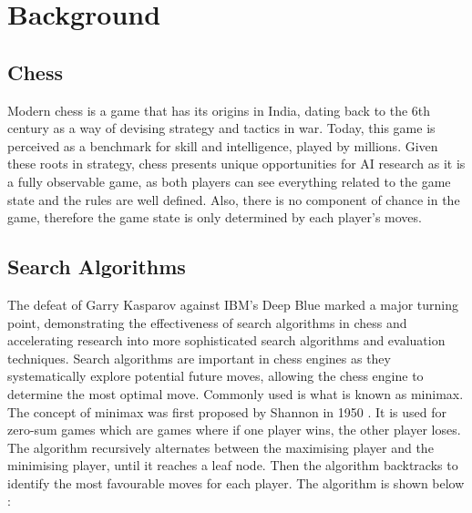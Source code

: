 \chapter{Background}
\section{Chess}
Modern chess is a game that has its origins in India, dating back to the 6th century \cite{averbakhHistoryChessChaturanga2012} as a way of devising strategy and tactics in war. Today, this game is perceived as a benchmark for skill and intelligence, played by millions. Given these roots in strategy, chess presents unique opportunities for AI research as it is a fully observable game, as both players can see everything related to the game state and the rules are well defined. Also, there is no component of chance in the game, therefore the game state is only determined by each player's moves.


\section{Search Algorithms}

The defeat of Garry Kasparov against IBM's Deep Blue marked a major turning point, demonstrating the effectiveness of search algorithms in chess and accelerating research into more sophisticated search algorithms and evaluation techniques. Search algorithms are important in chess engines as they systematically explore potential future moves, allowing the chess engine to determine the most optimal move. Commonly used is what is known as minimax. The concept of minimax was first proposed by Shannon in 1950 \cite{shannonXXIIProgrammingComputer1950}.
It is used for zero-sum games which are games where if one player wins, the other player loses. The algorithm recursively alternates between the maximising player and the minimising player, until it reaches a leaf node. Then the algorithm backtracks to identify the most favourable moves for each player. The algorithm is shown below \cite{russellArtificialIntelligenceModern2022}:


